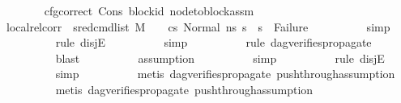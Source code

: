 \begin{isabellebody}
\isanewline
\ \ \ \ \ \ \isamarkupfalse%
\ cfg{\isacharunderscore}{\kern0pt}correct\ Cons\ block{\isacharunderscore}{\kern0pt}id\ node{\isacharunderscore}{\kern0pt}to{\isacharunderscore}{\kern0pt}block{\isacharunderscore}{\kern0pt}assm\isanewline
\ \ \ \ \ \ \isamarkupfalse%
\ local{\isacharunderscore}{\kern0pt}rel{\isacharunderscore}{\kern0pt}corr{\isacharcolon}{\kern0pt}\ {\isachardoublequoteopen}{\isacharparenleft}{\kern0pt}{\isasymAnd}\ s{}{\isacharprime}{\kern0pt}{\isachardot}{\kern0pt}{\isacharparenleft}{\kern0pt}{\isacharparenleft}{\kern0pt}red{\isacharunderscore}{\kern0pt}cmd{\isacharunderscore}{\kern0pt}list\ M\ {\isasymLambda}\ {\isasymGamma}\ {\isasymOmega}\ cs{}\ {\isacharparenleft}{\kern0pt}Normal\ ns{}{\isacharparenright}{\kern0pt}\ s{}{\isacharprime}{\kern0pt}{\isacharparenright}{\kern0pt}\ {\isasymLongrightarrow}\ {\isacharparenleft}{\kern0pt}s{}{\isacharprime}{\kern0pt}\ {\isasymnoteq}\ Failure{\isacharparenright}{\kern0pt}{\isacharparenright}{\kern0pt}{\isacharparenright}{\kern0pt}{\isachardoublequoteclose}\isanewline
\ \ \ \ \ \ \ \ \isamarkupfalse%
\ {\isacharparenleft}{\kern0pt}simp{\isacharparenright}{\kern0pt}\isanewline
\ \ \ \ \ \ \ \ \isamarkupfalse%
\ {\isacharparenleft}{\kern0pt}rule\ disjE{\isacharparenright}{\kern0pt}\isanewline
\ \ \ \ \ \ \ \ \isamarkupfalse%
\ simp\isanewline
\ \ \ \ \ \ \ \ \isamarkupfalse%
\ {\isacharparenleft}{\kern0pt}rule\ dag{\isacharunderscore}{\kern0pt}verifies{\isacharunderscore}{\kern0pt}propagate{\isacharunderscore}{\kern0pt}{}{\isacharparenright}{\kern0pt}\isanewline
\ \ \ \ \ \ \ \ \isamarkupfalse%
\ blast\isanewline
\ \ \ \ \ \ \ \ \isamarkupfalse%
\ assumption\isanewline
\ \ \ \ \ \ \ \ \isamarkupfalse%
\ simp\isanewline
\ \ \ \ \ \ \ \ \isamarkupfalse%
\ {\isacharparenleft}{\kern0pt}rule\ disjE{\isacharparenright}{\kern0pt}\isanewline
\ \ \ \ \ \ \ \ \isamarkupfalse%
\ simp\isanewline
\ \ \ \ \ \ \ \ \isamarkupfalse%
\ {\isacharparenleft}{\kern0pt}metis\ dag{\isacharunderscore}{\kern0pt}verifies{\isacharunderscore}{\kern0pt}propagate{\isacharunderscore}{\kern0pt}{}\ push{\isacharunderscore}{\kern0pt}through{\isacharunderscore}{\kern0pt}assumption{}{\isacharparenright}{\kern0pt}\isanewline
\ \ \ \ \ \ \ \ \isamarkupfalse%
\ {\isacharparenleft}{\kern0pt}metis\ dag{\isacharunderscore}{\kern0pt}verifies{\isacharunderscore}{\kern0pt}propagate{\isacharunderscore}{\kern0pt}{}\ push{\isacharunderscore}{\kern0pt}through{\isacharunderscore}{\kern0pt}assumption{}{\isacharparenright}{\kern0pt}\isanewline

\end{isabellebody}
